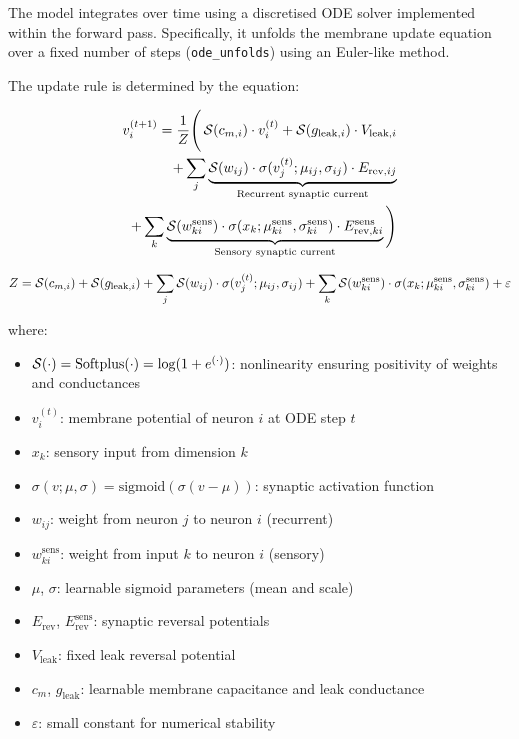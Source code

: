 The model integrates over time using a discretised ODE solver implemented within the forward pass. Specifically, it unfolds the membrane update equation over a fixed number of steps (\texttt{ode\_unfolds}) using an Euler-like method.

\noindent The update rule is determined by the equation:

\begin{equation}
    \begin{aligned}
    v_i^{(t+1)} = \frac{1}{Z} \Bigg( 
    \operatorname{\mathcal{S}}(c_{m,i}) \cdot v_i^{(t)} + 
    \operatorname{\mathcal{S}}(g_{\text{leak},i}) \cdot V_{\text{leak},i} \\
    + \sum_j \underbrace{ \operatorname{\mathcal{S}}(w_{ij}) \cdot \sigma(v_j^{(t)}; \mu_{ij}, \sigma_{ij}) \cdot E_{\text{rev},ij} }_{\text{Recurrent synaptic current}} \\
    + \sum_k \underbrace{ \operatorname{\mathcal{S}}(w^{\text{sens}}_{ki}) \cdot \sigma(x_k; \mu^{\text{sens}}_{ki}, \sigma^{\text{sens}}_{ki}) \cdot E^{\text{sens}}_{\text{rev},ki} }_{\text{Sensory synaptic current}} 
    \Bigg)
    \end{aligned}
    \label{eq:v_update}
\end{equation}

\begin{equation}
Z = 
\operatorname{\mathcal{S}}(c_{m,i}) + 
\operatorname{\mathcal{S}}(g_{\text{leak},i}) +
\sum_j \operatorname{\mathcal{S}}(w_{ij}) \cdot \sigma(v_j^{(t)}; \mu_{ij}, \sigma_{ij}) +
\sum_k \operatorname{\mathcal{S}}(w^{\text{sens}}_{ki}) \cdot \sigma(x_k; \mu^{\text{sens}}_{ki}, \sigma^{\text{sens}}_{ki}) + \varepsilon
\label{eq:v_update_denominator}
\end{equation}

\noindent where:
\begin{itemize}
    \item \( \operatorname{\mathcal{S}}(\cdot) = \text{Softplus}(\cdot) = \log(1 + e^{(\cdot)}) \): nonlinearity ensuring positivity of weights and conductances
    \item $v_i^{(t)}$: membrane potential of neuron $i$ at ODE step $t$
    \item $x_k$: sensory input from dimension $k$
    \item $\sigma(v; \mu, \sigma) = \text{sigmoid}(\sigma (v - \mu))$: synaptic activation function
    \item $w_{ij}$: weight from neuron $j$ to neuron $i$ (recurrent)
    \item $w^{\text{sens}}_{ki}$: weight from input $k$ to neuron $i$ (sensory)
    \item $\mu$, $\sigma$: learnable sigmoid parameters (mean and scale)
    \item $E_{\text{rev}}$, $E^{\text{sens}}_{\text{rev}}$: synaptic reversal potentials
    \item $V_{\text{leak}}$: fixed leak reversal potential
    \item $c_m$, $g_{\text{leak}}$: learnable membrane capacitance and leak conductance
    \item $\varepsilon$: small constant for numerical stability
\end{itemize}

